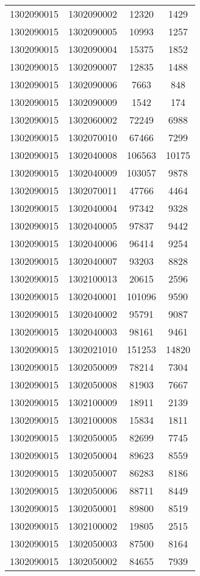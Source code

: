 \begin{longtable}[h]{llcc}
		1302090015 & 1302090002 & 12320 & 1429\\
		1302090015 & 1302090005 & 10993 & 1257\\
		1302090015 & 1302090004 & 15375 & 1852\\
		1302090015 & 1302090007 & 12835 & 1488\\
		1302090015 & 1302090006 & 7663 & 848\\
		1302090015 & 1302090009 & 1542 & 174\\
		1302090015 & 1302060002 & 72249 & 6988\\
		1302090015 & 1302070010 & 67466 & 7299\\
		1302090015 & 1302040008 & 106563 & 10175\\
		1302090015 & 1302040009 & 103057 & 9878\\
		1302090015 & 1302070011 & 47766 & 4464\\
		1302090015 & 1302040004 & 97342 & 9328\\
		1302090015 & 1302040005 & 97837 & 9442\\
		1302090015 & 1302040006 & 96414 & 9254\\
		1302090015 & 1302040007 & 93203 & 8828\\
		1302090015 & 1302100013 & 20615 & 2596\\
		1302090015 & 1302040001 & 101096 & 9590\\
		1302090015 & 1302040002 & 95791 & 9087\\
		1302090015 & 1302040003 & 98161 & 9461\\
		1302090015 & 1302021010 & 151253 & 14820\\
		1302090015 & 1302050009 & 78214 & 7304\\
		1302090015 & 1302050008 & 81903 & 7667\\
		1302090015 & 1302100009 & 18911 & 2139\\
		1302090015 & 1302100008 & 15834 & 1811\\
		1302090015 & 1302050005 & 82699 & 7745\\
		1302090015 & 1302050004 & 89623 & 8559\\
		1302090015 & 1302050007 & 86283 & 8186\\
		1302090015 & 1302050006 & 88711 & 8449\\
		1302090015 & 1302050001 & 89800 & 8519\\
		1302090015 & 1302100002 & 19805 & 2515\\
		1302090015 & 1302050003 & 87500 & 8164\\
		1302090015 & 1302050002 & 84655 & 7939\\

\end{longtable}
